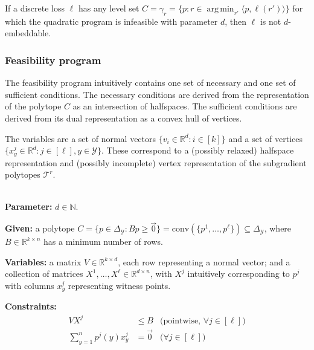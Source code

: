 \documentclass[anon]{colt2020} %
\newcommand{\reals}{\mathbb{R}}
\newcommand{\simplex}{\Delta_\Y}
\newcommand{\T}{\mathcal{T}}
\newcommand{\Y}{\mathcal{Y}}
\newcommand{\inprod}[2]{\langle #1, #2 \rangle}%
\newcommand{\conv}{\mathrm{conv}}
\DeclareMathOperator*{\argmin}{arg\,min}
\begin{document}
\begin{corollary}\label{cor:d-embeddable-char}
  If a discrete loss $\ell$ has any level set $C = \gamma_r = \{p : r \in \argmin_{r'} \inprod{p}{\ell(r')} \}$ for which the quadratic program is infeasible with parameter $d$, then $\ell$ is not $d$-embeddable.
\end{corollary}


\subsubsection{Feasibility program}

The feasibility program intuitively contains one set of necessary and one set of sufficient conditions.
The necessary conditions are derived from the representation of the polytope $C$ as an intersection of halfspaces.
The sufficient conditions are derived from its dual representation as a convex hull of vertices.

The variables are a set of normal vectors $\{v_i \in \reals^d : i \in [k]\}$ and a set of vertices $\{x^j_y \in \reals^d : j \in [\ell], y \in \Y\}$.
These correspond to a (possibly relaxed) halfspace representation and (possibly incomplete) vertex representation of the subgradient polytopes $\T^r$.

\begin{definition} \label{def:qfp} ~ \\
  \indent \textbf{Parameter:} $d \in \mathbb{N}$.

  \textbf{Given:} a polytope $C = \{p \in \simplex : Bp \geq \vec 0\} = \conv(\{p^1, \ldots, p^\ell\}) \subseteq \simplex$, where $B \in \reals^{k \times n}$ has a minimum number of rows.

  \textbf{Variables:} a matrix $V \in \reals^{k \times d}$, each row representing a normal vector; and a collection of matrices $X^1,\ldots,X^{\ell} \in \reals^{d \times n}$, with $X^j$ intuitively corresponding to $p^j$ with columns $x^j_y$ representing witness points.

  \textbf{Constraints:}
    \begin{align}
      V X^j                     &\leq B    & \text{(pointwise, $\forall j \in [\ell]$)}  \label{eqn:qp-constr-1} \\
      \sum_{y=1}^n p^j(y) x^j_y &= \vec 0  & \text{($\forall j \in [\ell]$)}    \label{eqn:qp-constr-2} 
    \end{align}
\end{definition}
\end{document}
